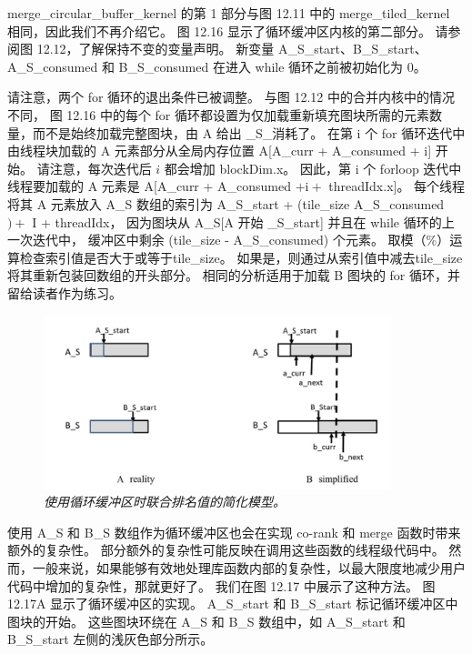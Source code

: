merge\_circular\_buffer\_kernel 的第 1 部分与图 12.11 中的 merge\_tiled\_kernel 相同，因此我们不再介绍它。 
图 12.16 显示了循环缓冲区内核的第二部分。 请参阅图 12.12，了解保持不变的变量声明。 
新变量 A\_S\_start、B\_S\_start、A\_S\_consumed 和 B\_S\_consumed 在进入 while 循环之前被初始化为 0。

请注意，两个 for 循环的退出条件已被调整。 与图 12.12 中的合并内核中的情况不同，
图 12.16 中的每个 for 循环都设置为仅加载重新填充图块所需的元素数量，而不是始终加载完整图块，由 A 给出 \_S\_消耗了。 
在第 i 个 for 循环迭代中由线程块加载的 A 元素部分从全局内存位置 A[A\_curr + A\_consumed + i] 开始。 
请注意，每次迭代后 $i$ 都会增加 blockDim.x。 
因此，第 i 个 forloop 迭代中线程要加载的 A 元素是 A[A\_curr + A\_consumed $+\mathrm{i}+$ threadIdx.x]。 
每个线程将其 A 元素放入 A\_S 数组的索引为 A\_S\_start + (tile\_size A\_S\_consumed $)+$ I + threadIdx，
因为图块从 A\_S[A 开始 \_S\_start] 并且在 while 循环的上一次迭代中，
缓冲区中剩余 (tile\_size - A\_S\_consumed) 个元素。 取模（\%）运算检查索引值是否大于或等于tile\_size。 
如果是，则通过从索引值中减去tile\_size 将其重新包装回数组的开头部分。 
相同的分析适用于加载 B 图块的 for 循环，并留给读者作为练习。

\begin{figure}[H]
	\centering
	\includegraphics[width=0.9\textwidth]{figs/F12.17.png}
	\caption{\textit{使用循环缓冲区时联合排名值的简化模型。}}
\end{figure}

使用 A\_S 和 B\_S 数组作为循环缓冲区也会在实现 co-rank 和 merge 函数时带来额外的复杂性。 
部分额外的复杂性可能反映在调用这些函数的线程级代码中。 
然而，一般来说，如果能够有效地处理库函数内部的复杂性，以最大限度地减少用户代码中增加的复杂性，那就更好了。 
我们在图 12.17 中展示了这种方法。 图 12.17A 显示了循环缓冲区的实现。 
A\_S\_start 和 B\_S\_start 标记循环缓冲区中图块的开始。 
这些图块环绕在 A\_S 和 B\_S 数组中，如 A\_S\_start 和 B\_S\_start 左侧的浅灰色部分所示。

